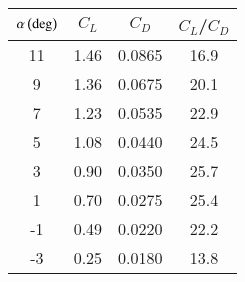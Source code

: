 \begin{center}
    \begin{tabular}{|c|c|c|c|} 
        \hline
            $\alpha \left(\text{deg}\right)$ & $C_L$ & $C_D$ & $C_L$/$C_D$ \\
        \hline
            11 & 1.46 & 0.0865 & 16.9 \\
        \hline
            9 & 1.36 & 0.0675 & 20.1 \\
        \hline
            7 & 1.23 & 0.0535 & 22.9 \\
        \hline
            5 & 1.08 & 0.0440 & 24.5 \\
        \hline
	    3 & 0.90 & 0.0350 & 25.7 \\
	\hline
	    1 & 0.70 & 0.0275 & 25.4 \\
	\hline
            -1 & 0.49 & 0.0220 & 22.2 \\
	\hline
	    -3 & 0.25 & 0.0180 & 13.8 \\
	\hline
    \end{tabular}
\end{center}
